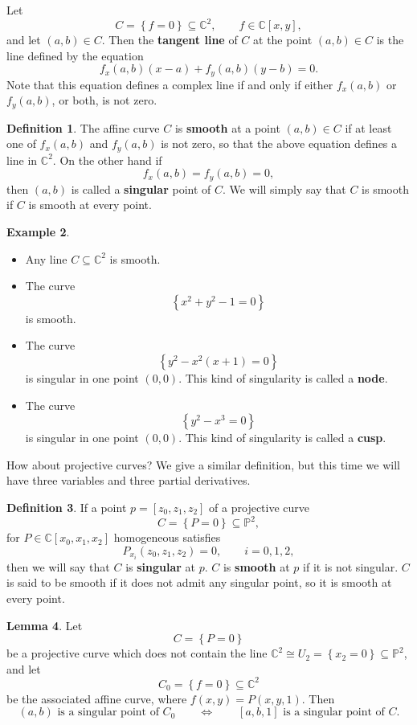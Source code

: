 \documentclass{article}
\newcommand{\C}{\mathbb{C}}
\renewcommand{\P}{\mathbb{P}}
\newcommand{\rb}[1]{\left( #1 \right)}
\renewcommand{\sb}[1]{\left[ #1 \right]}
\newcommand{\cb}[1]{\left\{ #1 \right\}}
\theoremstyle{definition}\newtheorem{definition}{Definition}[section]
\theoremstyle{definition}\newtheorem{notation}[definition]{Notation}
\theoremstyle{definition}\newtheorem{remark}[definition]{Remark}
\theoremstyle{definition}\newtheorem{example1}[definition]{Example}
\theoremstyle{definition}\newtheorem{fact}{Fact}
\theoremstyle{definition}\newtheorem{exercise}{Exercise}
\theoremstyle{definition}\newtheorem*{example2}{Example}
\newtheorem{lemma}[definition]{Lemma}
\begin{document}
Let
$$ C = \cb{f = 0} \subseteq \C^2, \qquad f \in \C\sb{x, y}, $$
and let $ \rb{a, b} \in C $. Then the \textbf{tangent line} of $ C $ at the point $ \rb{a, b} \in C $ is the line defined by the equation
$$ f_x\rb{a, b}\rb{x - a} + f_y\rb{a, b}\rb{y - b} = 0. $$
Note that this equation defines a complex line if and only if either $ f_x\rb{a, b} $ or $ f_y\rb{a, b} $, or both, is not zero.

\begin{definition}
The affine curve $ C $ is \textbf{smooth} at a point $ \rb{a, b} \in C $ if at least one of $ f_x\rb{a, b} $ and $ f_y\rb{a, b} $ is not zero, so that the above equation defines a line in $ \C^2 $. On the other hand if
$$ f_x\rb{a, b} = f_y\rb{a, b} = 0, $$
then $ \rb{a, b} $ is called a \textbf{singular} point of $ C $. We will simply say that $ C $ is smooth if $ C $ is smooth at every point.
\end{definition}

\begin{example1}
\hfill
\begin{itemize}
\item Any line $ C \subseteq \C^2 $ is smooth.
\item The curve
$$ \cb{x^2 + y^2 - 1 = 0} $$
is smooth.
\item The curve
$$ \cb{y^2 - x^2\rb{x + 1} = 0} $$
is singular in one point $ \rb{0, 0} $. This kind of singularity is called a \textbf{node}.
\item The curve
$$ \cb{y^2 - x^3 = 0} $$
is singular in one point $ \rb{0, 0} $. This kind of singularity is called a \textbf{cusp}.
\end{itemize}
\end{example1}

How about projective curves? We give a similar definition, but this time we will have three variables and three partial derivatives.

\begin{definition}
If a point $ p = \sb{z_0, z_1, z_2} $ of a projective curve
$$ C = \cb{P = 0} \subseteq \P^2, $$
for $ P \in \C\sb{x_0, x_1, x_2} $ homogeneous satisfies
$$ P_{x_i}\rb{z_0, z_1, z_2} = 0, \qquad i = 0, 1, 2, $$
then we will say that $ C $ is \textbf{singular} at $ p $. $ C $ is \textbf{smooth} at $ p $ if it is not singular. $ C $ is said to be smooth if it does not admit any singular point, so it is smooth at every point.
\end{definition}

\begin{lemma}
\label{lem:7.5}
Let
$$ C = \cb{P = 0} $$
be a projective curve which does not contain the line $ \C^2 \cong U_2 = \cb{x_2 = 0} \subseteq \P^2 $, and let
$$ C_0 = \cb{f = 0} \subseteq \C^2 $$
be the associated affine curve, where $ f\rb{x, y} = P\rb{x, y, 1} $. Then
$$ \rb{a, b} \text{ is a singular point of } C_0 \qquad \iff \qquad \sb{a, b, 1} \text{ is a singular point of } C. $$
\end{lemma}
\end{document}
